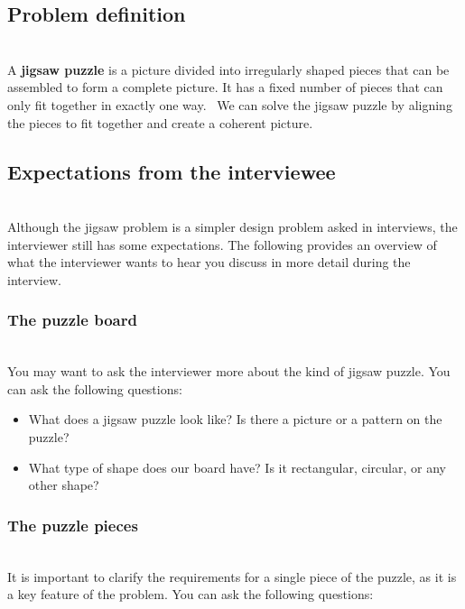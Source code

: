 

\subsection{Problem definition}\label{-N5LI3p7HyvOu2woinYv-}
\\
A \textbf{jigsaw puzzle} is a picture divided into irregularly shaped pieces that can be assembled to form a complete picture. It has a fixed number of pieces that can only fit together in exactly one way. ~We can solve the jigsaw puzzle by aligning the pieces to fit together and create a coherent picture.

\subsection{Expectations from the interviewee}\label{rr1SKw3aIUIhO-l3xxcpc}
\\
Although the jigsaw problem is a simpler design problem asked in interviews, the interviewer still has some expectations. The following provides an overview of what the interviewer wants to hear you discuss in more detail during the interview.

\subsubsection{The puzzle board}\label{5Dkp693MDWVw_Pisu-Em3}
\\
You may want to ask the interviewer more about the kind of jigsaw puzzle. You can ask the following questions:

\begin{itemize}
\item
\protect{}\label{5Kj4FyMuYei-9HO8nR0-m}
What does a jigsaw puzzle look like? Is there a picture or a pattern on the puzzle?
\item
\protect{}\label{NrL62hH4jQGAMby-JpmcE}
What type of shape does our board have? Is it rectangular, circular, or any other shape?
\end{itemize}

\subsubsection{The puzzle pieces}\label{i1t2hfEmbBedf6HHWEky2}
\\
It is important to clarify the requirements for a single piece of the puzzle, as it is a key feature of the problem. You can ask the following questions:

